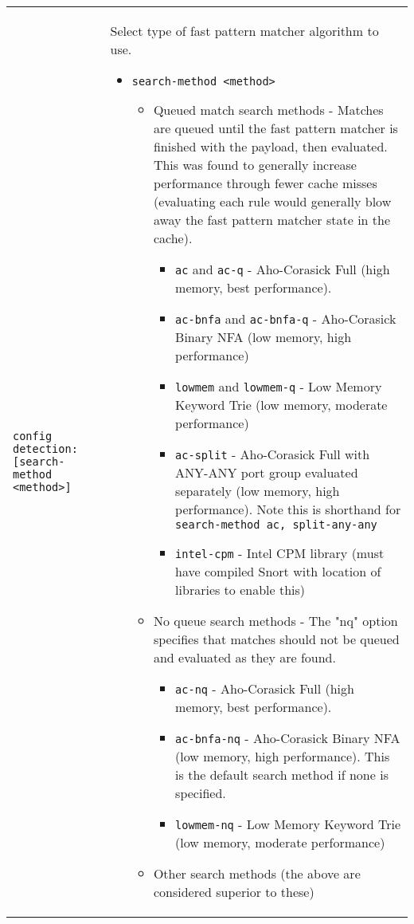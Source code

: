 \documentclass[english]{report}
\begin{document}
\begin{center}
\begin{longtable}[t]{| p{2.5in} | p{3.5in} |}
\hline
\texttt{config detection: [search-method <method>]} & Select type of fast pattern
matcher algorithm to use.
\begin{itemize}
\item \texttt{search-method <method>}
\begin{itemize}
\item Queued match search methods -  Matches are queued until the fast pattern
matcher is finished with the payload, then evaluated.  This was found to generally
increase performance through fewer cache misses (evaluating each rule would
generally blow away the fast pattern matcher
state in the cache).
\begin{itemize}
\item \texttt{ac} and \texttt{ac-q} - Aho-Corasick Full (high memory, best performance).
\item \texttt{ac-bnfa} and \texttt{ac-bnfa-q} - Aho-Corasick Binary NFA (low memory, high performance)
\item \texttt{lowmem} and \texttt{lowmem-q} - Low Memory Keyword Trie (low memory, moderate performance)
\item \texttt{ac-split} - Aho-Corasick Full with ANY-ANY port group evaluated separately (low memory, high performance).  Note this is shorthand for \texttt{search-method ac, split-any-any}
\item \texttt{intel-cpm} - Intel CPM library (must have compiled Snort with location of libraries to enable this)
\end{itemize}
\end{itemize}
\begin{itemize}
\item No queue search methods - The "nq" option specifies that matches should not
be queued and evaluated as they are found.
\begin{itemize}
\item \texttt{ac-nq} - Aho-Corasick Full (high memory, best performance).
\item \texttt{ac-bnfa-nq} - Aho-Corasick Binary NFA (low memory, high performance).
This is the default search method if none is specified.
\item \texttt{lowmem-nq} - Low Memory Keyword Trie (low memory, moderate performance)
\end{itemize}
\end{itemize}
\begin{itemize}
\item Other search methods (the above are considered superior to these)
\begin{itemize}

\end{itemize}
\end{itemize}
\end{itemize}
\end{longtable}
\end{center}
\end{document}
